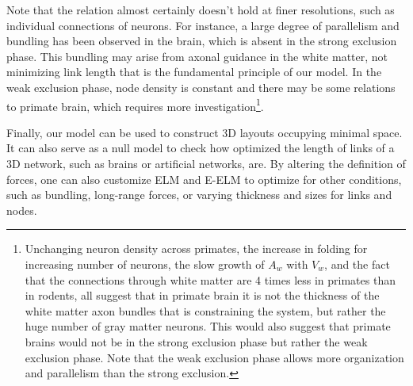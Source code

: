 \documentclass[nofootinbib,preprint,floatfix,titlepage,endfloats]{revtex4} %
\begin{document}
Note that the relation almost certainly doesn't hold at finer resolutions, such as individual connections of neurons. 
For instance, a large degree of parallelism and bundling has been observed in the brain\cite{le2001diffusion,assaf2008diffusion}, which is absent in the strong exclusion phase. This bundling may arise from axonal guidance in the white matter, not minimizing link length that is the fundamental principle of our model.
In the weak exclusion phase, node density is constant and there may be some relations to primate brain, which requires more investigation\footnote{
Unchanging neuron density across primates, the increase in folding for increasing number of neurons, the slow growth of $A_w$ with $V_w$, and the fact that the connections through white matter are 4 times less in primates than in rodents\cite{herculano2012remarkable}, all suggest that in primate brain it is not the thickness of the white matter axon bundles that is constraining the system, but rather the huge number of gray matter neurons. 
This would also suggest that primate brains would not be in the strong exclusion phase but rather the weak exclusion phase. Note that the weak exclusion phase allows more organization and parallelism than the strong exclusion.}.


Finally, our model can be used to construct 3D layouts occupying minimal space. 
It can also serve  as a null model to check how optimized the length of links of a 3D network, such as brains or artificial networks, are. 
By altering the definition  of forces, one can also customize ELM and E-ELM to optimize for other conditions, such as bundling, long-range forces, or varying thickness and sizes for links and nodes. 



\newpage
\newpage
\end{document}
